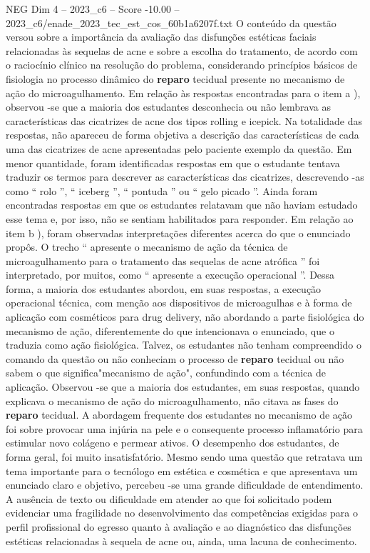 \begin{textsample}{NEG Dim 4 – 2023\_c6 – Score -10.00 – 2023\_c6/enade\_2023\_tec\_est\_cos\_60b1a6207f.txt}
O conteúdo da questão versou sobre a importância da avaliação das disfunções estéticas faciais relacionadas às sequelas de acne e sobre a escolha do tratamento, de acordo com o raciocínio clínico na resolução do problema, considerando princípios básicos de fisiologia no processo dinâmico do \textbf{reparo} tecidual presente no mecanismo de ação do microagulhamento.
Em relação às respostas encontradas para o item a ), observou -se que a maioria dos estudantes desconhecia ou não lembrava as características das cicatrizes de acne dos tipos rolling e icepick.
Na totalidade das respostas, não apareceu de forma objetiva a descrição das características de cada uma das cicatrizes de acne apresentadas pelo paciente exemplo da questão.
Em menor quantidade, foram identificadas respostas em que o estudante tentava traduzir os termos para descrever as características das cicatrizes, descrevendo -as como “ rolo ”, “ iceberg ”, “ pontuda ” ou “ gelo picado ”.
Ainda foram encontradas respostas em que os estudantes relatavam que não haviam estudado esse tema e, por isso, não se sentiam habilitados para responder.
Em relação ao item b ), foram observadas interpretações diferentes acerca do que o enunciado propôs.
O trecho “ apresente o mecanismo de ação da técnica de microagulhamento para o tratamento das sequelas de acne atrófica ” foi interpretado, por muitos, como “ apresente a execução operacional ”.
Dessa forma, a maioria dos estudantes abordou, em suas respostas, a execução operacional técnica, com menção aos dispositivos de microagulhas e à forma de aplicação com cosméticos para drug delivery, não abordando a parte fisiológica do mecanismo de ação, diferentemente do que intencionava o enunciado, que o traduzia como ação fisiológica.
Talvez, os estudantes não tenham compreendido o comando da questão ou não conheciam o processo de \textbf{reparo} tecidual ou não sabem o que significa"mecanismo de ação", confundindo com a técnica de aplicação.
Observou -se que a maioria dos estudantes, em suas respostas, quando explicava o mecanismo de ação do microagulhamento, não citava as fases do \textbf{reparo} tecidual.
A abordagem frequente dos estudantes no mecanismo de ação foi sobre provocar uma injúria na pele e o consequente processo inflamatório para estimular novo colágeno e permear ativos.
O desempenho dos estudantes, de forma geral, foi muito insatisfatório.
Mesmo sendo uma questão que retratava um tema importante para o tecnólogo em estética e cosmética e que apresentava um enunciado claro e objetivo, percebeu -se uma grande dificuldade de entendimento.
A ausência de texto ou dificuldade em atender ao que foi solicitado podem evidenciar uma fragilidade no desenvolvimento das competências exigidas para o perfil profissional do egresso quanto à avaliação e ao diagnóstico das disfunções estéticas relacionadas à sequela de acne ou, ainda, uma lacuna de conhecimento.

\end{textsample}
